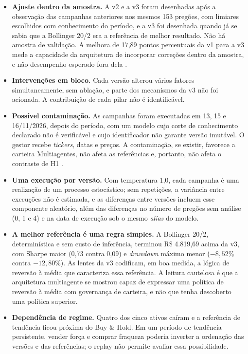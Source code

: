 \documentclass{eic-bcc-tcc}
\begin{document}
\begin{itemize}
    \item \textbf{Ajuste dentro da amostra.} A v2 e a v3 foram desenhadas após a observação das campanhas anteriores nos mesmos 153 pregões, com limiares escolhidos com conhecimento do período, e a v3 foi desenhada quando já se sabia que a Bollinger 20/2 era a referência de melhor resultado. Não há amostra de validação. A melhora de 17,89 pontos percentuais da v1 para a v3 mede a capacidade da arquitetura de incorporar correções dentro da amostra, e não desempenho esperado fora dela \citep{White2000, Bailey2017}.
    \item \textbf{Intervenções em bloco.} Cada versão alterou vários fatores simultaneamente, sem ablação, e parte dos mecanismos da v3 não foi acionada. A contribuição de cada pilar não é identificável.
    \item \textbf{Possível contaminação.} As campanhas foram executadas em 13, 15 e 16/11/2026, depois do período, com um modelo cujo corte de conhecimento declarado não é verificável e cujo identificador não garante versão imutável. O gestor recebe \textit{tickers}, datas e preços. A contaminação, se existir, favorece a carteira Multiagentes, não afeta as referências e, portanto, não afeta o contraste de H1 \citep{Glasserman2023, Golchin2024}.
    \item \textbf{Uma execução por versão.} Com temperatura 1,0, cada campanha é uma realização de um processo estocástico; sem repetições, a variância entre execuções não é estimada, e as diferenças entre versões incluem esse componente aleatório, além das diferenças no número de pregões sem análise (0, 1 e 4) e na data de execução sob o mesmo \textit{alias} do modelo.
    \item \textbf{A melhor referência é uma regra simples.} A Bollinger 20/2, determinística e sem custo de inferência, terminou R\$ 4.819,69 acima da v3, com Sharpe maior (0,73 contra 0,09) e \textit{drawdown} máximo menor ($-8{,}52\%$ contra $-12{,}80\%$). As lentes da v3 codificam, em boa medida, a lógica de reversão à média que caracteriza essa referência. A leitura cautelosa é que a arquitetura multiagente se mostrou capaz de expressar uma política de reversão à média com governança de carteira, e não que tenha descoberto uma política superior.
    \item \textbf{Dependência de regime.} Quatro dos cinco ativos caíram e a referência de tendência ficou próxima do Buy \& Hold. Em um período de tendência persistente, vender força e comprar fraqueza poderia inverter a ordenação das versões e das referências; o replay não permite avaliar essa possibilidade.

\end{itemize}
\end{document}
